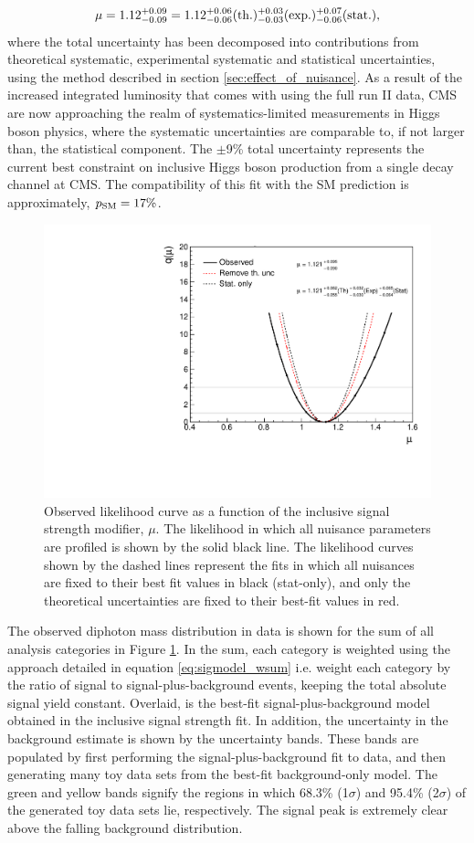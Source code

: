 \begin{equation*}
  \mu = 1.12 ^{+0.09}_{-0.09} = 1.12 ^{+0.06}_{-0.06}({\rm{th.}}) ^{+0.03}_{-0.03}({\rm{exp.}}) ^{+0.07}_{-0.06}({\rm{stat.}}),
\end{equation*}
\noindent
where the total uncertainty has been decomposed into contributions from theoretical systematic, experimental systematic and statistical uncertainties, using the method described in section \ref{sec:effect_of_nuisance}. As a result of the increased integrated luminosity that comes with using the full run II data, CMS are now approaching the realm of systematics-limited measurements in Higgs boson physics, where the systematic uncertainties are comparable to, if not larger than, the statistical component. The $\pm$9\% total uncertainty represents the current best constraint on inclusive Higgs boson production from a single decay channel at CMS. The compatibility of this fit with the SM prediction is approximately, $p_{\rm{SM}}=17\%$.

\begin{figure}[htb]
  \centering
  \includegraphics[width=.6\textwidth]{Figures/hgg_results/likelihood_mu.pdf}
  \caption[Observed likelihood curve for the inclusive signal strength]
  {
    Observed likelihood curve as a function of the inclusive signal strength modifier, $\mu$. The likelihood in which all nuisance parameters are profiled is shown by the solid black line. The likelihood curves shown by the dashed lines represent the fits in which all nuisances are fixed to their best fit values in black (stat-only), and only the theoretical uncertainties are fixed to their best-fit values in red.
  }
  \label{fig:sb_inclusive}
\end{figure}

The observed diphoton mass distribution in data is shown for the sum of all analysis categories in Figure \ref{fig:sb_inclusive}. In the sum, each category is weighted using the approach detailed in equation \ref{eq:sigmodel_wsum} i.e. weight each category by the ratio of signal to signal-plus-background events, keeping the total absolute signal yield constant. Overlaid, is the best-fit signal-plus-background model obtained in the inclusive signal strength fit. In addition, the uncertainty in the background estimate is shown by the uncertainty bands. These bands are populated by first performing the signal-plus-background fit to data, and then generating many toy data sets from the best-fit background-only model. The green and yellow bands signify the regions in which 68.3\% (1$\sigma$) and 95.4\% (2$\sigma$) of the generated toy data sets lie, respectively. The signal peak is extremely clear above the falling background distribution.

